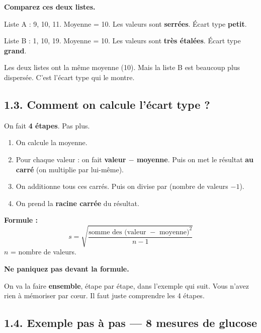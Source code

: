 \documentclass[12pt,a4paper]{article}
\begin{document}
\begin{enclair}
\textbf{Comparez ces deux listes.}

\vspace{0.2cm}
Liste A : 9, 10, 11. Moyenne = 10. Les valeurs sont \textbf{serrées}. Écart type \textbf{petit}.

\vspace{0.2cm}
Liste B : 1, 10, 19. Moyenne = 10. Les valeurs sont \textbf{très étalées}. Écart type \textbf{grand}.

\vspace{0.2cm}
Les deux listes ont la même moyenne (10). Mais la liste B est beaucoup plus dispersée. C'est l'écart type qui le montre.
\end{enclair}

\subsection*{1.3. Comment on calcule l'écart type ?}

\begin{rappel}
On fait \textbf{4 étapes}. Pas plus.

\vspace{0.2cm}
\begin{enumerate}[leftmargin=*]
  \item On calcule la moyenne.
  \item Pour chaque valeur : on fait \textbf{valeur $-$ moyenne}. Puis on met le résultat \textbf{au carré} (on multiplie par lui-même).
  \item On additionne tous ces carrés. Puis on divise par (nombre de valeurs $- 1$).
  \item On prend la \textbf{racine carrée} du résultat.
\end{enumerate}

\vspace{0.2cm}
\textbf{Formule :}
\[
s = \sqrt{\frac{\text{somme des (valeur } - \text{ moyenne)}^2}{n - 1}}
\]
$n$ = nombre de valeurs.
\end{rappel}

\begin{attention}
\textbf{Ne paniquez pas devant la formule.}

\vspace{0.2cm}
On va la faire \textbf{ensemble}, étape par étape, dans l'exemple qui suit. Vous n'avez rien à mémoriser par cœur. Il faut juste comprendre les 4 étapes.
\end{attention}

\subsection*{1.4. Exemple pas à pas — 8 mesures de glucose}
\end{document}
